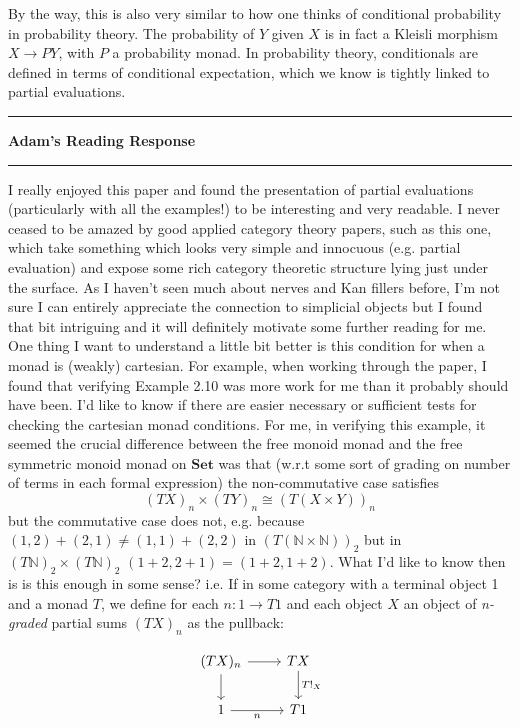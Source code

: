 \documentclass{amsart}
\newcommand{\iam}[1]{
  \vspace{0.25em}
  \hrule
  \vspace{0.25em}
  \textbf{{#1}'s Reading Response}
  \vspace{0.25em}
  \hrule
  \vspace{1em}
}
\begin{document}
By the way, this is also very similar to how one thinks of conditional probability in probability theory. The probability of $Y$ given $X$ is in fact a Kleisli morphism $X\to PY$, with $P$ a probability monad. In probability theory, conditionals are defined in terms of conditional expectation, which we know is tightly linked to partial evaluations.


\iam{Adam}

I really enjoyed this paper and found the presentation of partial evaluations (particularly with all the examples!) to be interesting and very readable. I never ceased to be amazed by good applied category theory papers, such as this one, which take something which looks very simple and innocuous (e.g. partial evaluation) and expose some rich category theoretic structure lying just under the surface. As I haven't seen much about nerves and Kan fillers before, I'm not sure I can entirely appreciate the connection to simplicial objects but I found that bit intriguing and it will definitely motivate some further reading for me. \\
One thing I want to understand a little bit better is this condition for when a monad is (weakly) cartesian. For example, when working through the paper, I found that verifying Example 2.10 was more work for me than it probably should have been. I'd like to know if there are easier necessary or sufficient tests for checking the cartesian monad conditions. For me, in verifying this example, it seemed the crucial difference between the free monoid monad and the free symmetric monoid monad on $\mathbf{Set}$ was that (w.r.t some sort of grading on number of terms in each formal expression) the non-commutative case satisfies
\[ (TX)_n \times (TY)_n \cong (T(X \times Y))_n \]
but the commutative case does not, e.g. because $(1,2) + (2, 1) \neq (1,1) + (2,2)$ in $(T(\mathbb{N} \times \mathbb{N}))_2$ but in $(T\mathbb{N})_2 \times (T\mathbb{N})_2$ $(1+2,2+1) = (1+2,1+2)$. What I'd like to know then is is this enough in some sense? i.e. If in some category with a terminal object 1 and a monad $T$, we define for each $n: 1 \rightarrow T1$ and each object $X$ an object of \textit{n-graded} partial sums $(TX)_n$ as the pullback:

\begin{equation*}
\begin{tikzcd}
(T X)_n
\arrow[r]
\arrow[d]
& T X
\arrow[d, "T!_X"]
\\
1
\arrow[r, "n"']
& T1
\end{tikzcd}
\end{equation*}
\end{document}
